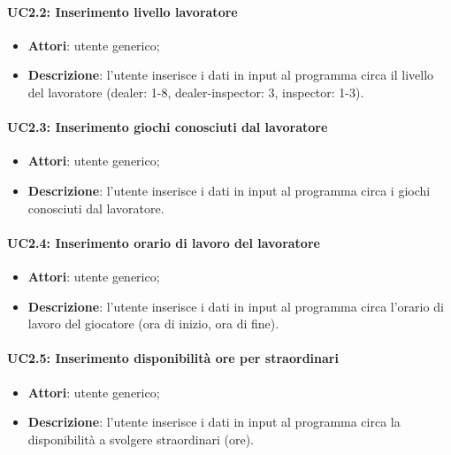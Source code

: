 \paragraph{UC2.2: Inserimento livello lavoratore}
\begin{itemize}
    \item \textbf{Attori}: utente generico;
    \item \textbf{Descrizione}: l'utente inserisce i dati in input al programma circa il livello del lavoratore (dealer: 1-8, dealer-inspector: 3, inspector: 1-3).
\end{itemize}
\paragraph{UC2.3: Inserimento giochi conosciuti dal lavoratore}
\begin{itemize}
    \item \textbf{Attori}: utente generico;
    \item \textbf{Descrizione}: l'utente inserisce i dati in input al programma circa i giochi conosciuti dal lavoratore.
\end{itemize}
\paragraph{UC2.4: Inserimento orario di lavoro del lavoratore}
\begin{itemize}
    \item \textbf{Attori}: utente generico;
    \item \textbf{Descrizione}: l'utente inserisce i dati in input al programma circa l'orario di lavoro del giocatore (ora di inizio, ora di fine).
\end{itemize}
\paragraph{UC2.5: Inserimento disponibilità ore per straordinari}
\begin{itemize}
    \item \textbf{Attori}: utente generico;
    \item \textbf{Descrizione}: l'utente inserisce i dati in input al programma circa la disponibilità a svolgere straordinari (ore).
\end{itemize}
\clearpage

